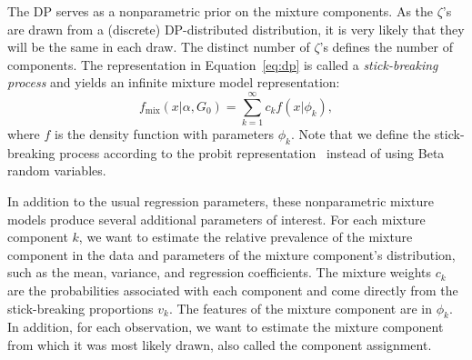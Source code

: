 \documentclass[a4paper,UKenglish]{oasics-v2016}
\begin{document}
The DP serves as a nonparametric prior on the mixture components. As the $\zeta$'s are drawn from a (discrete) DP-distributed distribution, it is very likely that they will be the same in each draw. The distinct number of $\zeta$'s defines the number of components.
The representation in Equation~\ref{eq:dp} is called a \emph{stick-breaking process} and yields an infinite mixture model representation:
$$
f_\text{mix}(x|\alpha, G_0) = \sum_{k=1}^{\infty} c_k f(x|\phi_k),
$$
where $f$ is the density function with parameters $\phi_k$. Note that we define the stick-breaking process according to the probit representation~\cite{rodriguez} instead of using Beta random variables.
% 
% 


In addition to the usual regression parameters, these nonparametric mixture models produce several additional parameters of interest. For each mixture component $k$, we want to estimate the relative prevalence of the mixture component in the data and parameters of the mixture component's distribution, such as the mean, variance, and regression coefficients. The mixture weights $c_k$ are the probabilities associated with each component and come directly from the  stick-breaking proportions $v_k$. The features of the mixture component are in $\phi_k$. In addition, for each observation, we want to estimate the mixture component from which it was most likely drawn, also called the component assignment.
\end{document}
